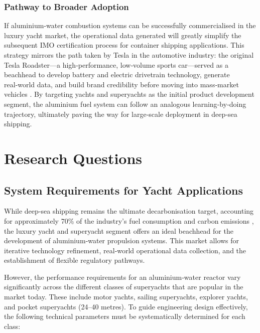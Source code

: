 \documentclass[12pt]{article}
\begin{document}
\subsubsection{Pathway to Broader Adoption}

If aluminium‑water combustion systems can be successfully commercialised in the luxury yacht market, the operational data generated will greatly simplify the subsequent IMO certification process for container shipping applications. This strategy mirrors the path taken by Tesla in the automotive industry: the original Tesla Roadster—a high‑performance, low‑volume sports car—served as a beachhead to develop battery and electric drivetrain technology, generate real‑world data, and build brand credibility before moving into mass‑market vehicles \cite{telsa-roadster-mit, tesla-beachhead}. By targeting yachts and superyachts as the initial product development segment, the aluminium fuel system can follow an analogous learning‑by‑doing trajectory, ultimately paving the way for large‑scale deployment in deep‑sea shipping.

\break

\section{Research Questions}

\subsection{System Requirements for Yacht Applications}
\label{sec-system-requirements-questions}

While deep‑sea shipping remains the ultimate decarbonisation target, accounting for approximately 70\% of the industry’s fuel consumption and carbon emissions \cite{share-of-different-range-ships}, the luxury yacht and superyacht segment offers an ideal beachhead for the development of aluminium‑water propulsion systems. This market allows for iterative technology refinement, real‑world operational data collection, and the establishment of flexible regulatory pathways.

However, the performance requirements for an aluminium‑water reactor vary significantly across the different classes of superyachts that are popular in the market today. These include motor yachts, sailing superyachts, explorer yachts, and pocket superyachts (24–40 metres). To guide engineering design effectively, the following technical parameters must be systematically determined for each class:
\end{document}
